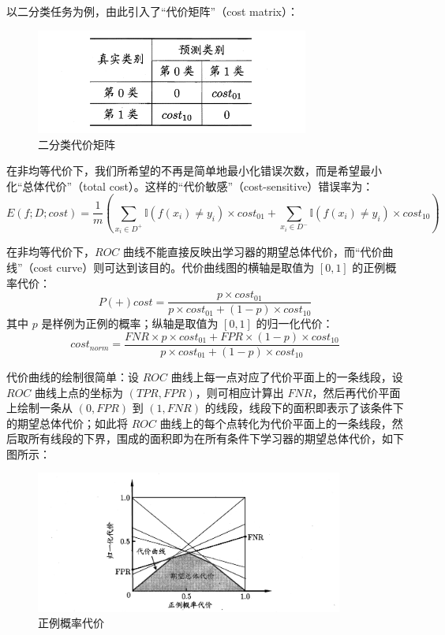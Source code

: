 \documentclass[12pt, a4paper]{article} %
\begin{document}
以二分类任务为例，由此引入了“代价矩阵”（cost matrix）：

\begin{figure}[H]
    \centering
    \includegraphics[width=0.8\textwidth]{../img/2-5-二分类代价矩阵.png}
    \caption{二分类代价矩阵}
    \label{fig:二分类代价矩阵}
\end{figure}

在非均等代价下，我们所希望的不再是简单地最小化错误次数，而是希望最小化“总体代价”（total cost）。这样的“代价敏感”（cost-sensitive）错误率为：
\begin{equation*}
    E(f; D; cost) = \frac{1}{m} \left(
        \sum_{x_i \in D^+} \mathbb{I} (f(x_i) \ne y_i) \times cost_{01} + \sum_{x_i \in D^-} \mathbb{I} (f(x_i) \ne y_i) \times cost_{10}
    \right)
\end{equation*}

在非均等代价下，$ROC$ 曲线不能直接反映出学习器的期望总体代价，而“代价曲线”（cost curve）则可达到该目的。代价曲线图的横轴是取值为 $[0, 1]$ 的正例概率代价：
\begin{equation*}
    P(+)cost = \frac{p \times cost_{01}}{p \times cost_{01} + (1 - p) \times cost_{10}}
\end{equation*}
其中 $p$ 是样例为正例的概率；纵轴是取值为 $[0, 1]$ 的归一化代价：
\begin{equation*}
    cost_{norm} = \frac{FNR \times p \times cost_{01} + FPR \times (1 - p) \times cost_{10}}{p \times cost_{01} + (1 - p) \times cost_{10}}
\end{equation*}

代价曲线的绘制很简单：设 $ROC$ 曲线上每一点对应了代价平面上的一条线段，设 $ROC$ 曲线上点的坐标为 $(TPR, FPR)$，则可相应计算出 $FNR$，然后再代价平面上绘制一条从 $(0, FPR)$ 到 $(1, FNR)$ 的线段，线段下的面积即表示了该条件下的期望总体代价；如此将 $ROC$ 曲线上的每个点转化为代价平面上的一条线段，然后取所有线段的下界，围成的面积即为在所有条件下学习器的期望总体代价，如下图所示：

\begin{figure}[H]
    \centering
    \includegraphics[width=0.9\textwidth]{../img/2-6-正例概率代价.png}
    \caption{正例概率代价}
    \label{fig:正例概率代价}
\end{figure}
\end{document}
